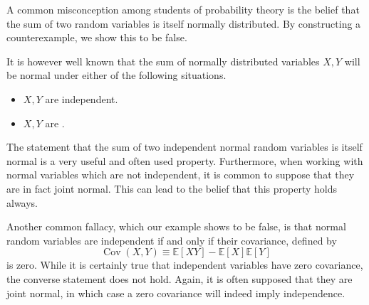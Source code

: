 \documentclass[12pt]{article}
\begin{document}
 
A common misconception among students of probability theory is the belief that the sum of two  random variables is itself normally distributed. By constructing a counterexample, we show this to be false.

It is however well known that the sum of normally distributed variables  $X,Y$ will be normal under either of the following situations.
\begin{itemize}
\item $X,Y$ are independent.
\item $X,Y$ are .
\end{itemize}
The statement that the sum of two independent normal random variables is itself normal is a very useful and often used property. Furthermore, when working with normal variables which are not independent, it is common to suppose that they are in fact joint normal. This can lead to the belief that this property holds always.

Another common fallacy, which our example shows to be false, is that normal random variables are independent if and only if their covariance, defined by
\begin{equation*}
\operatorname{Cov}(X,Y)\equiv\mathbb{E}[XY]-\mathbb{E}[X]\mathbb{E}[Y]
\end{equation*}
is zero. While it is certainly true that independent variables have zero covariance, the converse statement does not hold. Again, it is often supposed that they are joint normal, in which case a zero covariance will indeed imply independence.
\end{document}
